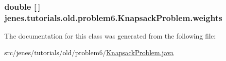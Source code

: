 \hypertarget{classjenes_1_1tutorials_1_1old_1_1problem6_1_1_knapsack_problem_afdefd7f28bc8f4569e2119d9d7e6d9a7}{
\subsubsection[{weights}]{\setlength{\rightskip}{0pt plus 5cm}double \mbox{[}$\,$\mbox{]} jenes.\-tutorials.\-old.\-problem6.\-Knapsack\-Problem.\-weights\hspace{0.3cm}{\ttfamily [private]}}}\label{classjenes_1_1tutorials_1_1old_1_1problem6_1_1_knapsack_problem_afdefd7f28bc8f4569e2119d9d7e6d9a7}


The documentation for this class was generated from the following file\-:\begin{DoxyCompactItemize}
\item 
src/jenes/tutorials/old/problem6/\hyperlink{old_2problem6_2_knapsack_problem_8java}{Knapsack\-Problem.\-java}\end{DoxyCompactItemize}

